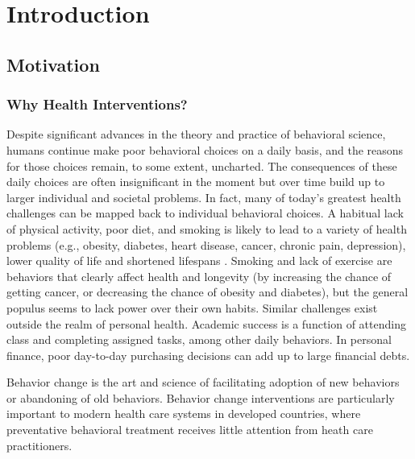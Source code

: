 
\section{Introduction} %

\subsection{Motivation}

\subsubsection{Why Health Interventions?}
Despite significant advances in the theory and practice of behavioral science, humans continue make poor behavioral choices on a daily basis, and the reasons for those choices remain, to some extent, uncharted. 
The consequences of these daily choices are often insignificant in the moment but over time build up to larger individual and societal problems. 
In fact, many of today's greatest health challenges can be mapped back to individual behavioral choices.
A habitual lack of physical activity, poor diet, and smoking is likely to lead to a variety of health problems (e.g., obesity, diabetes, heart disease, cancer, chronic pain, depression), lower quality of life and shortened lifespans \cite{franco2005, dunn2001, yanbaeva2007, ross2000}. 
Smoking and lack of exercise are behaviors that clearly affect health and longevity (by increasing the chance of getting cancer, or decreasing the chance of obesity and diabetes), but the general populus seems to lack power over their own habits.
Similar challenges exist outside the realm of personal health. 
Academic success is a function of attending class and completing assigned tasks, among other daily behaviors\cite{cooper2006}.
In personal finance, poor day-to-day purchasing decisions can add up to large financial debts\cite{norvilitis2003}.

Behavior change is the art and science of facilitating adoption of new behaviors or abandoning of old behaviors.
Behavior change interventions are particularly important to modern health care systems in developed countries, where preventative behavioral treatment receives little attention from heath care practitioners.


